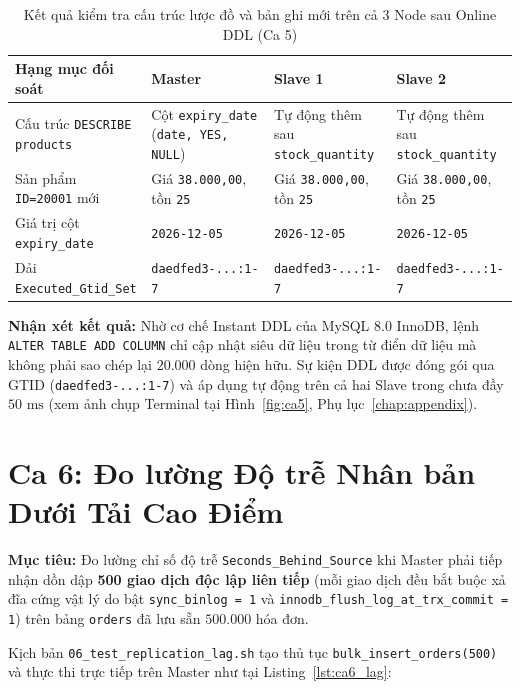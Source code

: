 \documentclass[12pt,a4paper]{report}
\begin{document}
\begin{table}[H]
\centering
\footnotesize
\caption{Kết quả kiểm tra cấu trúc lược đồ và bản ghi mới trên cả 3 Node sau Online DDL (Ca 5)}
\label{tab:ca5_results}
\vspace{0.15cm}
\begin{tabularx}{\textwidth}{L{3.8cm} L{3.6cm} L{3.6cm} Y}
\toprule
\textbf{Hạng mục đối soát} & \textbf{Master} & \textbf{Slave 1} & \textbf{Slave 2} \\
\midrule
Cấu trúc \texttt{DESCRIBE products} & Cột \texttt{expiry\_date} (\texttt{date, YES, NULL}) & Tự động thêm sau \texttt{stock\_quantity} & Tự động thêm sau \texttt{stock\_quantity} \\
Sản phẩm \texttt{ID=20001} mới & Giá \texttt{38.000,00}, tồn \texttt{25} & Giá \texttt{38.000,00}, tồn \texttt{25} & Giá \texttt{38.000,00}, tồn \texttt{25} \\
Giá trị cột \texttt{expiry\_date} & \texttt{2026-12-05} & \texttt{2026-12-05} & \texttt{2026-12-05} \\
Dải \texttt{Executed\_Gtid\_Set} & \texttt{daedfed3-...:1-7} & \texttt{daedfed3-...:1-7} & \texttt{daedfed3-...:1-7} \\
\bottomrule
\end{tabularx}
\end{table}

\noindent \textbf{Nhận xét kết quả:} Nhờ cơ chế Instant DDL của MySQL 8.0 InnoDB, lệnh \texttt{ALTER TABLE ADD COLUMN} chỉ cập nhật siêu dữ liệu trong từ điển dữ liệu mà không phải sao chép lại $20.000$ dòng hiện hữu. Sự kiện DDL được đóng gói qua GTID (\texttt{daedfed3-...:1-7}) và áp dụng tự động trên cả hai Slave trong chưa đầy $50\text{ ms}$ (xem ảnh chụp Terminal tại Hình~\ref{fig:ca5}, Phụ lục~\ref{chap:appendix}).

\section{Ca 6: Đo lường Độ trễ Nhân bản Dưới Tải Cao Điểm}
\textbf{Mục tiêu:} Đo lường chỉ số độ trễ \texttt{Seconds\_Behind\_Source} khi Master phải tiếp nhận dồn dập \textbf{500 giao dịch độc lập liên tiếp} (mỗi giao dịch đều bắt buộc xả đĩa cứng vật lý do bật \texttt{sync\_binlog = 1} và \texttt{innodb\_flush\_log\_at\_trx\_commit = 1}) trên bảng \texttt{orders} đã lưu sẵn $500.000$ hóa đơn.

Kịch bản \texttt{06\_test\_replication\_lag.sh} tạo thủ tục \texttt{bulk\_insert\_orders(500)} và thực thi trực tiếp trên Master như tại Listing~\ref{lst:ca6_lag}:
\end{document}
